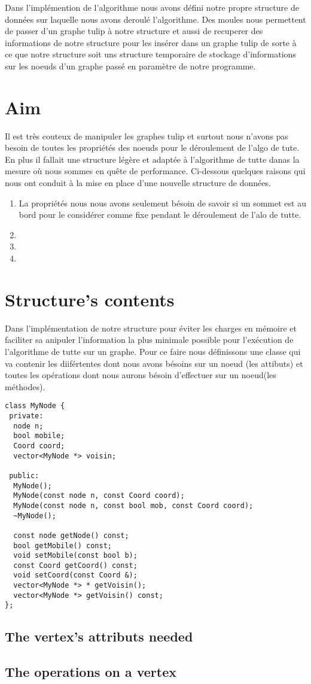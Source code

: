 Dans l'implémention de l'algorithme nous avons défini notre propre structure de données sur laquelle nous avons deroulé l'algorithme. Des moules nous permettent de passer d'un graphe tulip à notre structure et aussi de recuperer des informations de notre structure pour les insérer dans un graphe tulip de sorte à ce que notre structure soit uns structure temporaire de stockage d'informations sur les noeuds d'un graphe passé en paramètre de notre programme. 

\section{Aim}
Il est très couteux de manipuler les graphes tulip et surtout nous n'avons pas besoin de toutes les propriétés des noeuds pour le déroulement de l'algo de tute. En plus il fallait une structure légère et adaptée à l'algorithme de tutte danas la mesure où nous sommes en quête de performance. Ci-dessous quelques raisons qui nous ont conduit à la mise en place d'une nouvelle structure de données.
\begin{enumerate}
\item La propriétés nous nous avons seulement bésoin de savoir si un sommet est au bord pour le considérer comme fixe pendant le déroulement de l'alo de tutte.
\item
\item
\item
\end{enumerate}  

\section{Structure's contents}

Dans l'implémentation de notre structure pour éviter les charges en mémoire et faciliter sa anipuler l'information la plus minimale possible pour l'exécution de l'algorithme de tutte sur un graphe. Pour ce faire nous définissons une classe qui va contenir les diifértentes dont nous avons bésoins sur un noeud (les attibuts) et toutes les opérations dont nous aurons bésoin d'effectuer sur un noeud(les méthodes).

\begin{lstlisting}
class MyNode {
 private:
  node n;
  bool mobile;
  Coord coord;  
  vector<MyNode *> voisin;

 public:
  MyNode();
  MyNode(const node n, const Coord coord);
  MyNode(const node n, const bool mob, const Coord coord);
  ~MyNode();
  
  const node getNode() const;
  bool getMobile() const;
  void setMobile(const bool b);
  const Coord getCoord() const;
  void setCoord(const Coord &);
  vector<MyNode *> * getVoisin();
  vector<MyNode *> getVoisin() const;
};
\end{lstlisting}

\subsection{The vertex's attributs needed}


\subsection{The operations on a vertex}
